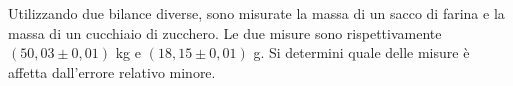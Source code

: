 Utilizzando due bilance diverse, sono misurate la massa 
di un sacco di farina e la massa di un cuc\-chia\-io di zucchero. 
Le due misure sono rispettivamente $(50,03 \pm 0,01)$ kg e 
$(18,15 \pm 0,01)$ g. 
Si determini quale delle misure è affetta dall'errore 
relativo minore.